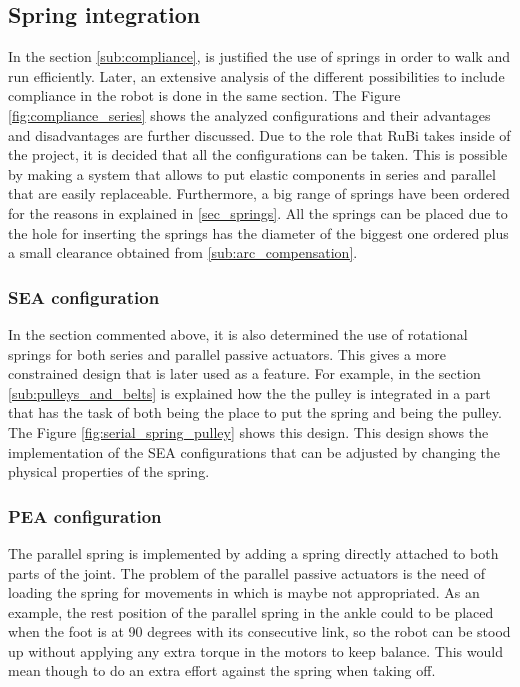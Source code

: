 \subsection{Spring integration} %


\label{sub:spring_integration}
In the section \ref{sub:compliance}, is justified the use of springs in order to walk and run efficiently. 
Later, an extensive analysis of the different possibilities to include compliance in the robot is done in the same section.
The Figure \ref{fig:compliance_series} shows the analyzed configurations and their advantages and disadvantages are further discussed.
Due to the role that RuBi takes inside of the project, it is decided that all the configurations can be taken.
This is possible by making a system that allows to put elastic components in series and parallel that are easily replaceable.
Furthermore, a big range of springs have been ordered for the reasons in explained in \ref{sec_springs}.
All the springs can be placed due to the hole for inserting the springs has the diameter of the biggest one ordered plus a small clearance obtained from \ref{sub:arc_compensation}.

\subsubsection{SEA configuration} %
\label{ssub:sea_configuration}

In the section commented above, it is also determined the use of rotational springs for both series and parallel passive actuators.
This gives a more constrained design that is later used as a feature.
For example, in the section \ref{sub:pulleys_and_belts} is explained how the the pulley is integrated in a part that has the task of both being the place to put the spring and being the pulley.
The Figure \ref{fig:serial_spring_pulley} shows this design.
This design shows the implementation of the SEA configurations that can be adjusted by changing the physical properties of the spring.

\subsubsection{PEA configuration} %
\label{ssub:pea_configuration}

The parallel spring is implemented by adding a spring directly attached to both parts of the joint.
The problem of the parallel passive actuators is the need of loading the spring for movements in which is maybe not appropriated.
As an example, the rest position of the parallel spring in the ankle could to be placed when the foot is at 90 degrees with its consecutive link, so the robot can be stood up without applying any extra torque in the motors to keep balance.
This would mean though to do an extra effort against the spring when taking off.

